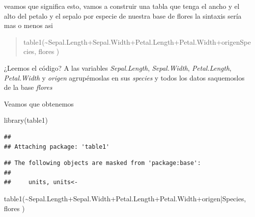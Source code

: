 \documentclass[
]{book}
\newenvironment{Shaded}{\begin{snugshade}}{\end{snugshade}}
\newcommand{\FunctionTok}[1]{\textcolor[rgb]{0.00,0.00,0.00}{#1}}
\newcommand{\NormalTok}[1]{#1}
\newcommand{\SpecialCharTok}[1]{\textcolor[rgb]{0.00,0.00,0.00}{#1}}
\begin{document}
veamos que significa esto, vamos a construir una tabla que tenga el ancho y el alto del petalo y el sepalo por especie de nuestra base de flores la sintaxis sería mas o menos asi

\begin{quote}
table1(\textasciitilde Sepal.Length+Sepal.Width+Petal.Length+Petal.Width+origen\textbar Species, flores )
\end{quote}

¿Leemos el código? A las variables \emph{Sepal.Length}, \emph{Sepal.Width}, \emph{Petal.Length}, \emph{Petal.Width} y \emph{origen} agrupémoslas en sus \emph{species} y todos los datos saquemoslos de la base \emph{flores}

Veamos que obtenemos

\begin{Shaded}
\begin{Highlighting}[]
\FunctionTok{library}\NormalTok{(table1)}
\end{Highlighting}
\end{Shaded}

\begin{verbatim}
## 
## Attaching package: 'table1'
\end{verbatim}

\begin{verbatim}
## The following objects are masked from 'package:base':
## 
##     units, units<-
\end{verbatim}

\begin{Shaded}
\begin{Highlighting}[]
\FunctionTok{table1}\NormalTok{(}\SpecialCharTok{\textasciitilde{}}\NormalTok{Sepal.Length}\SpecialCharTok{+}\NormalTok{Sepal.Width}\SpecialCharTok{+}\NormalTok{Petal.Length}\SpecialCharTok{+}\NormalTok{Petal.Width}\SpecialCharTok{+}\NormalTok{origen}\SpecialCharTok{|}\NormalTok{Species, flores )}
\end{Highlighting}
\end{Shaded}
\end{document}
